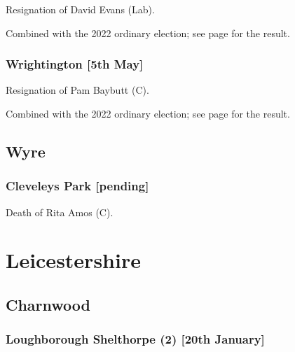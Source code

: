 \documentclass[a4paper,openany]{book}
\begin{document}
\begin{resultsiii}
Resignation of David Evans (Lab).

Combined with the 2022 ordinary election; see page \pageref{WestLancsBurscoughEast} for the result.

\subsubsection*{Wrightington \hspace*{\fill}\nolinebreak[1]%
	\enspace\hspace*{\fill}
	[5th May]}


Resignation of Pam Baybutt (C).

Combined with the 2022 ordinary election; see page \pageref{WestLancsWrightington} for the result.

\subsection*{Wyre}

\subsubsection*{Cleveleys Park \hspace*{\fill}\nolinebreak[1]%
	\enspace\hspace*{\fill}
	[pending]}


Death of Rita Amos (C).

\section{Leicestershire}

\subsection*{Charnwood}

\subsubsection*{Loughborough Shelthorpe (2) \hspace*{\fill}\nolinebreak[1]%
	\enspace\hspace*{\fill}
	[20th January]}


\end{resultsiii}
\end{document}
